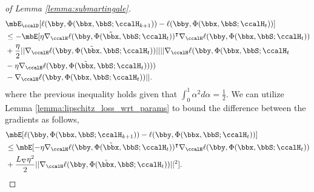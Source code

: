\begin{proof}[of Lemma \ref{lemma:submartingale}]
	\begin{align}
		&\mbE_\ccalD[\ell(\bby,\Phi(\bbx,\bbS;\ccalH_{k+1}))-\ell(\bby,\Phi(\bbx,\bbS;\ccalH_t))]\nonumber\\
		&\leq - \mbE[\eta\nabla_\ccalH\ell(\bby,\Phi(\tilde \bbx,\bbS;\ccalH_t)) ^\intercal\nabla_\ccalH\ell(\bby,\Phi(\bbx,\bbS;\ccalH_t))\\
		&+\frac{\eta }{2}||\nabla_\ccalH\ell(\bby,\Phi(\tilde\bbx,\bbS;\ccalH_t))|| || \nabla_\ccalH\ell(\bby,\Phi(\bbx,\bbS;\ccalH_t\nonumber\\
  &-\eta\nabla_\ccalH\ell(\bby,\Phi(\tilde \bbx,\bbS;\ccalH_t))))\nonumber\\
  &-\nabla_\ccalH\ell(\bby,\Phi(\bbx,\bbS;\ccalH_t))||.\nonumber 
	\end{align}
	where the previous inequality holds given that $\int_0^1 \alpha^2 d\alpha=\frac{1}{2}$. We can utilize Lemma \ref{lemma:lipschitz_loss_wrt_params} to bound the difference between the gradients as follows, 
	\begin{align}
		&\mbE[\ell(\bby,\Phi(\bbx,\bbS;\ccalH_{k+1}))-\ell(\bby,\Phi(\bbx,\bbS;\ccalH_t))]\\
		&\leq \mbE[-\eta\nabla_\ccalH\ell(\bby,\Phi(\tilde \bbx,\bbS;\ccalH_t)) ^\intercal\nabla_\ccalH\ell(\bby,\Phi(\bbx,\bbS;\ccalH_t))\nonumber\\
  &+\frac{\lipGrad\eta ^2}{2}||\nabla_\ccalH\ell(\bby,\Phi(\tilde\bbx,\bbS;\ccalH_t))||^2]\nonumber .
	\end{align}
	

\end{proof}
